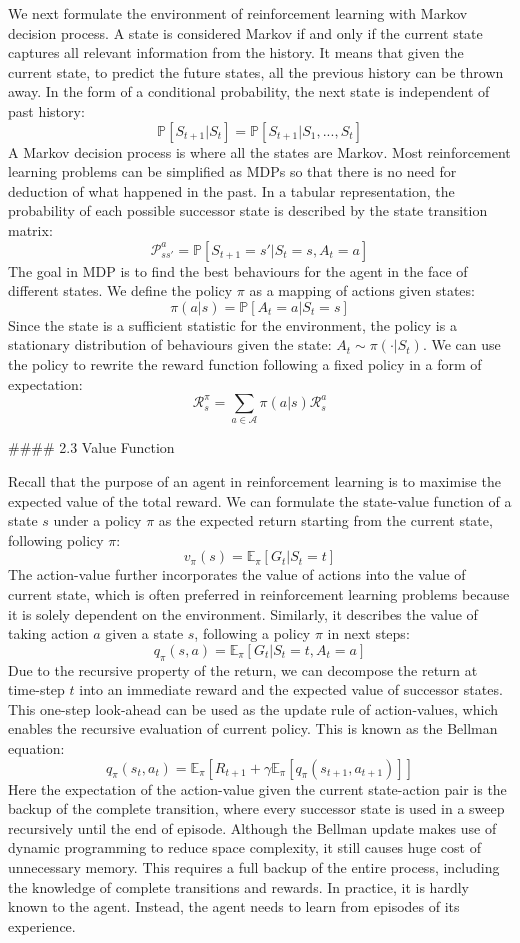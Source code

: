 \documentclass[twoside,12pt,a4paper]{article}
\begin{document}
We next formulate the environment of reinforcement learning with Markov decision process. A state is considered Markov if and only if the current state captures all relevant information from the history. It means that given the current state, to predict the future states, all the previous history can be thrown away. In the form of a conditional probability, the next state is independent of past history:
$$
\mathbb P[S_{t+1}|S_t]=\mathbb P[S_{t+1}|S_1,...,S_t]
$$
A Markov decision process is where all the states are Markov. Most reinforcement learning problems can be simplified as MDPs so that there is no need for deduction of what happened in the past. In a tabular representation, the probability of each possible successor state is described by the state transition matrix:
$$
\mathcal P_{ss'}^a=\mathbb P[S_{t+1}=s'|S_t=s, A_t=a]
$$
The goal in MDP is to find the best behaviours for the agent in the face of different states. We define the policy $\pi$ as a mapping of actions given states:
$$
\pi(a|s) = \mathbb P[A_t=a|S_t=s]
$$
Since the state is a sufficient statistic for the environment, the policy is a stationary distribution of behaviours given the state: $A_t \sim \pi(\cdot|S_t)$. We can use the policy to rewrite the reward function following a fixed policy in a form of expectation:
$$
\mathcal R_s^\pi = \sum_{a\in \mathcal A}\pi(a|s)\mathcal R_s^a
$$



#### 2.3 Value Function

Recall that the purpose of an agent in reinforcement learning is to maximise the expected value of the total reward. We can formulate the state-value function of a state $s$ under a policy $\pi$ as the expected return starting from the current state, following policy $\pi$:
$$
v_\pi(s) = \mathbb E_\pi[G_t|S_t=t]
$$
The action-value further incorporates the value of actions into the value of current state, which is often preferred in reinforcement learning problems because it is solely dependent on the environment. Similarly, it describes the value of taking action $a$ given a state $s$, following a policy $\pi$ in next steps:
$$
q_\pi(s,a) = \mathbb E_\pi[G_t|S_t = t, A_t = a]
$$
Due to the recursive property of the return, we can decompose the return at time-step $t$ into an immediate reward and the expected value of successor states. This one-step look-ahead can be used as the update rule of action-values, which enables the recursive evaluation of current policy. This is known as the Bellman equation:
$$
q_\pi(s_t,a_t) = \mathbb E_\pi[R_{t+1} + \gamma\mathbb E_\pi [q_\pi(s_{t+1}, a_{t+1})]]
$$
Here the expectation of the action-value given the current state-action pair is the backup of the complete transition, where every successor state is used in a sweep recursively until the end of episode. Although the Bellman update makes use of dynamic programming to reduce space complexity, it still causes huge cost of unnecessary memory. This requires a full backup of the entire process, including the knowledge of complete transitions and rewards. In practice, it is hardly known to the agent. Instead, the agent needs to learn from episodes of its experience.
\end{document}

